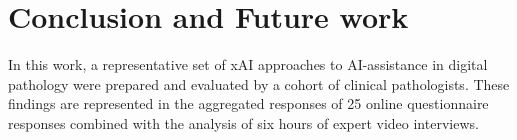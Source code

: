 
% 



\section{Conclusion and Future work}
\label{sec:FutureWork}

In this work, a representative set of xAI approaches to AI-assistance in digital pathology were prepared and evaluated by a cohort of clinical pathologists. These findings are represented in the aggregated responses of 25 online questionnaire responses combined with the analysis of six hours of expert video interviews. 

